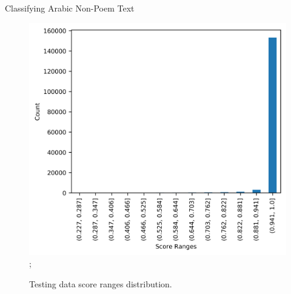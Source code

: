 \begin{frame}[fragile]{Classifying Arabic Non-Poem Text}
\begin{figure}[!t]
{\includegraphics[scale=.65]{./Figures/IMG_Result_Distribution.png}};
	\caption{Testing data score ranges distribution.}
\end{figure}

\end{frame}

